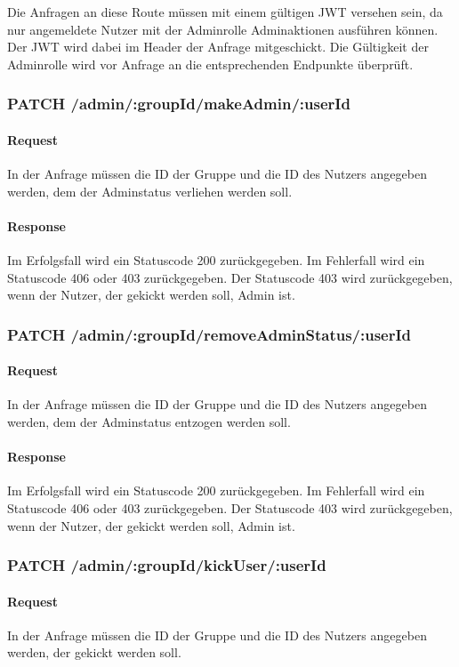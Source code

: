 \documentclass{entwurfsheft}
\begin{document}
\begin{sloppypar}
Die Anfragen an diese Route müssen mit einem gültigen JWT versehen sein, da nur angemeldete Nutzer mit der Adminrolle Adminaktionen ausführen können.
Der JWT wird dabei im Header der Anfrage mitgeschickt.
Die Gültigkeit der Adminrolle wird vor Anfrage an die entsprechenden Endpunkte überprüft.

\subsubsection*{PATCH /admin/:groupId/makeAdmin/:userId}
\paragraph{Request}
In der Anfrage müssen die ID der Gruppe und die ID des Nutzers angegeben werden, dem der Adminstatus verliehen werden soll.
\paragraph{Response}
Im Erfolgsfall wird ein Statuscode 200 zurückgegeben.
Im Fehlerfall wird ein Statuscode 406 oder 403 zurückgegeben. Der Statuscode 403 wird zurückgegeben, wenn der Nutzer, der gekickt werden soll, Admin ist.

\subsubsection*{PATCH /admin/:groupId/removeAdminStatus/:userId}
\paragraph{Request}
In der Anfrage müssen die ID der Gruppe und die ID des Nutzers angegeben werden, dem der Adminstatus entzogen werden soll.
\paragraph{Response}
Im Erfolgsfall wird ein Statuscode 200 zurückgegeben.
Im Fehlerfall wird ein Statuscode 406 oder 403 zurückgegeben. Der Statuscode 403 wird zurückgegeben, wenn der Nutzer, der gekickt werden soll, Admin ist.

\subsubsection*{PATCH /admin/:groupId/kickUser/:userId}
\paragraph{Request}
In der Anfrage müssen die ID der Gruppe und die ID des Nutzers angegeben werden, der gekickt werden soll.

\end{sloppypar}
\end{document}
